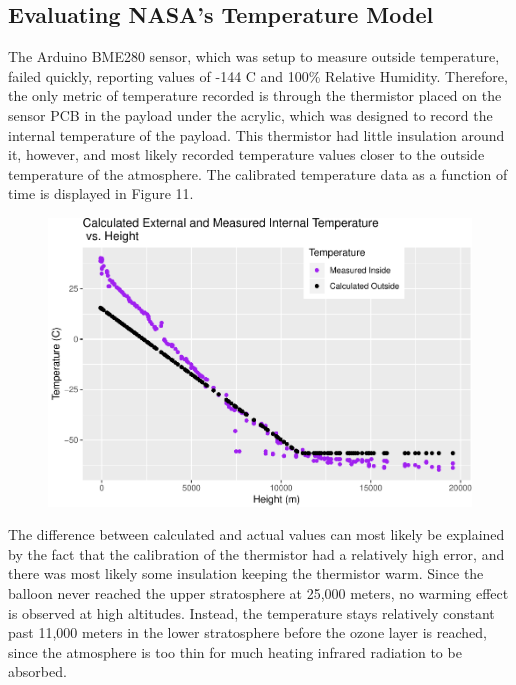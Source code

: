 \documentclass[12pt,]{article}
\begin{document}
\subsection{Evaluating NASA's Temperature
Model}\label{evaluating-nasas-temperature-model}

The Arduino BME280 sensor, which was setup to measure outside
temperature, failed quickly, reporting values of -144 \degree C and
100\% Relative Humidity. Therefore, the only metric of temperature
recorded is through the thermistor placed on the sensor PCB in the
payload under the acrylic, which was designed to record the internal
temperature of the payload. This thermistor had little insulation around
it, however, and most likely recorded temperature values closer to the
outside temperature of the atmosphere. The calibrated temperature data
as a function of time is displayed in Figure 11.

\begin{figure}[h]

{\centering \includegraphics{paper_files/figure-latex/temp_altitude-1} 

}

\caption{\label{fig:figs}}\label{fig:temp_altitude}
\end{figure}

The difference between calculated and actual values can most likely be
explained by the fact that the calibration of the thermistor had a
relatively high error, and there was most likely some insulation keeping
the thermistor warm. Since the balloon never reached the upper
stratosphere at 25,000 meters, no warming effect is observed at high
altitudes. Instead, the temperature stays relatively constant past
11,000 meters in the lower stratosphere before the ozone layer is
reached, since the atmosphere is too thin for much heating infrared
radiation to be absorbed.
\end{document}
